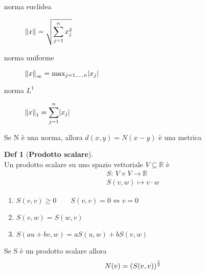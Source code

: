 \documentclass[a4paper,11pt]{report}
\theoremstyle{remark}
\theoremstyle{definition}
\newtheorem*{Def}{Def}
\newcommand{\R}{\mathbb{R}}
\DeclarePairedDelimiter{\abs}{\lvert}{\rvert}
\DeclarePairedDelimiter{\norma}{\lVert}{\rVert}
\begin{document}
\begin{description}
	\item[norma euclidea] $ \displaystyle \norma{x}= \sqrt{\sum_{j=1}^{n} x^2_j}$
	\item[norma uniforme] ${\norma{x}}_\infty = \max_{j=1,\dots,n} \abs{x_j}$
	\item[norma $L^1$] $\displaystyle {\norma{x}}_1 = \sum_{j=1}^{n} \abs{x_j}$
\end{description}
\noindent Se N è una norma, allora $d(x,y)=N(x-y)$ è una metrica
\begin{Def}[\textbf{Prodotto scalare}]\hfil\\
	Un prodotto scalare su uno spazio vettoriale $V \subseteq \R$ è
	\begin{gather*}
	S: \, V \times V  \to \R \\
	S(v,w) \mapsto v \cdot w 
	\end{gather*}
	\begin{enumerate}
		\item $S(v,v) \geq 0 \qquad S(v,v)=0 \iff v=0$
		\item $S(v,w)=S(w,v)$
		\item $S(au +bv,w) = aS(u,w) + bS(v,w)$
	\end{enumerate}
\end{Def}
\noindent Se S è un prodotto scalare allora 
\[N(v) = {(S(v,v))}^{1 \over 2}\]
\end{document}
